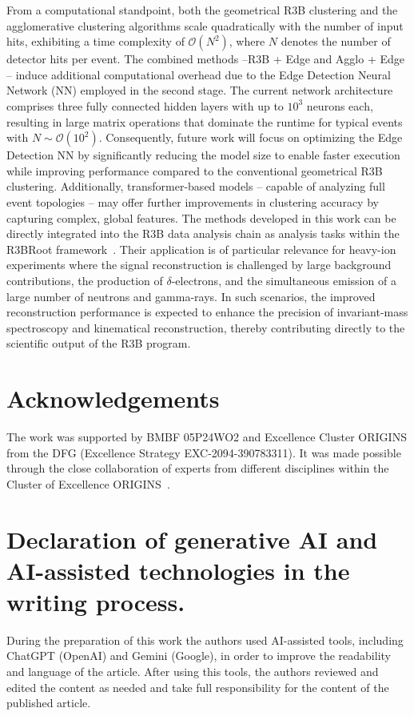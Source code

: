 \documentclass[review,sort&compress]{elsarticle}
\begin{document}
From a computational standpoint, both the geometrical R3B clustering and the agglomerative clustering algorithms scale quadratically with the number of input hits, exhibiting a time complexity of \(\mathcal{O}(N^2)\), where \(N\) denotes the number of detector hits per event. The combined methods --R3B + Edge and Agglo + Edge -- induce additional computational overhead due to the Edge Detection Neural Network (NN) employed in the second stage. The current network architecture comprises three fully connected hidden layers with up to \(10^3\) neurons each, resulting in large matrix operations that dominate the runtime for typical events with \(N \sim \mathcal{O}(10^2)\). Consequently, future work will focus on optimizing the Edge Detection NN by significantly reducing the model size to enable faster execution while improving performance compared to the conventional geometrical R3B clustering.\newline
Additionally, transformer-based models \cite{vaswani2017attention} -- capable of analyzing full event topologies -- may offer further improvements in clustering accuracy by capturing complex, global features.\newline
The methods developed in this work can be directly integrated into the R3B data analysis chain as analysis tasks within the R3BRoot framework~\cite{bertini2011r3broot}. Their application is of particular relevance for heavy-ion experiments where the signal reconstruction is challenged by large background contributions, the production of $\delta$-electrons, and the simultaneous emission of a large number of neutrons and gamma-rays. In such scenarios, the improved reconstruction performance is expected to enhance the precision of invariant-mass spectroscopy and kinematical reconstruction, thereby contributing directly to the scientific output of the R3B program.

\section*{Acknowledgements}
The work was supported by BMBF 05P24WO2 and Excellence Cluster ORIGINS from the DFG (Excellence Strategy EXC-2094-390783311). It was made possible through the close collaboration of experts from different disciplines within the Cluster of Excellence ORIGINS~\cite{origins2025}.

\section*{Declaration of generative AI and AI-assisted technologies in the writing process.}
During the preparation of this work the authors used AI-assisted tools, including ChatGPT (OpenAI) and Gemini (Google), in order to improve the readability and language of the article. After using this tools, the authors reviewed and edited the content as needed and take full responsibility for the content of the published article.
\end{document}
